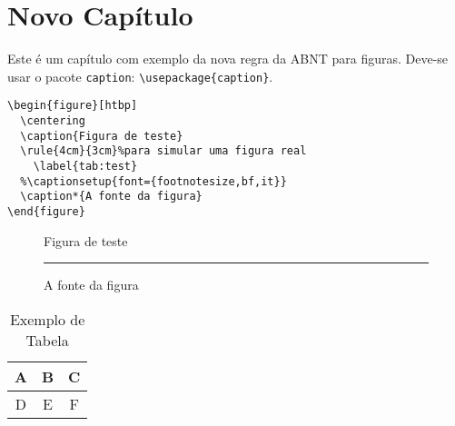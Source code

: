 \documentclass[a4paper,12pt]{scrbook}
\begin{document}
\chapter{Novo Capítulo}

Este é um capítulo com exemplo da nova regra da ABNT para figuras. 
Deve-se usar o pacote \texttt{caption}: \verb+\usepackage{caption}+.

\begin{verbatim}
\begin{figure}[htbp]
  \centering
  \caption{Figura de teste}
  \rule{4cm}{3cm}%para simular uma figura real
    \label{tab:test}
  %\captionsetup{font={footnotesize,bf,it}}
  \caption*{A fonte da figura}
\end{figure}
\end{verbatim}

\begin{figure}[htbp]
  \centering
  \caption{Figura de teste}
  \rule{4cm}{3cm}%
    \label{tab:test}
  \caption*{A fonte da figura}
\end{figure}


\begin{table}[htdp]
\caption{Exemplo de Tabela}
\begin{center}
\begin{tabular}{|c|c|c|}
A & B & C\\
\hline
D & E & F\\
\end{tabular}
\end{center}
\label{default}
\end{table}

\end{document}
